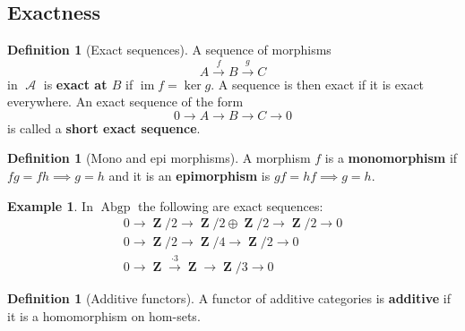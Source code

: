 \documentclass[10pt,]{book}
\newcommand{\terminology}[1]{\textbf{#1}}
\theoremstyle{plain}
\theoremstyle{definition}
\newtheorem{definition}[theorem]{Definition}
\newtheorem{example}[theorem]{Example}
\numberwithin{equation}{section}
\DeclareMathOperator{\im}{im}
\DeclareMathOperator{\Abgp}{\text{Abgp}}
\DeclareMathOperator{\ZZ}{\mathbf{Z}}
\DeclareMathOperator{\cA}{\mathcal{A}}
\begin{document}
\subsection[Exactness]{Exactness}\label{sec-exactness}
\begin{definition}[Exact sequences]\label{definition-3}
A sequence of morphisms \[A\xrightarrow{f} B \xrightarrow{g}C\] in \(\cA\) is \terminology{exact at \(B\)} if \(\im f = \ker g\).
              A sequence is then exact if it is exact everywhere.
              An exact sequence of the form \[0\to A \to B \to C \to 0\] is called a \terminology{short exact sequence}.
            \end{definition}
\begin{definition}[Mono and epi morphisms]\label{definition-4}
A morphism \(f\) is a \terminology{monomorphism} if \(fg = fh \implies g=h\) and it is an \terminology{epimorphism} is \(gf = hf \implies g=h\).\end{definition}
\begin{example}\label{example-4}
In \(\Abgp\) the following are exact sequences:
              \begin{gather*}
0\to \ZZ/2 \to \ZZ/2 \oplus \ZZ/2 \to \ZZ/2 \to 0\\
0\to \ZZ/2 \to \ZZ/4\to \ZZ/2 \to 0\\
0\to \ZZ \xrightarrow{\cdot 3} \ZZ\to \ZZ/3 \to 0
\end{gather*}\end{example}
\begin{definition}[Additive functors]\label{definition-5}
A functor of additive categories is \terminology{additive} if it is a homomorphism on hom-sets.\end{definition}
\typeout{************************************************}
\typeout{************************************************}
\end{document}
